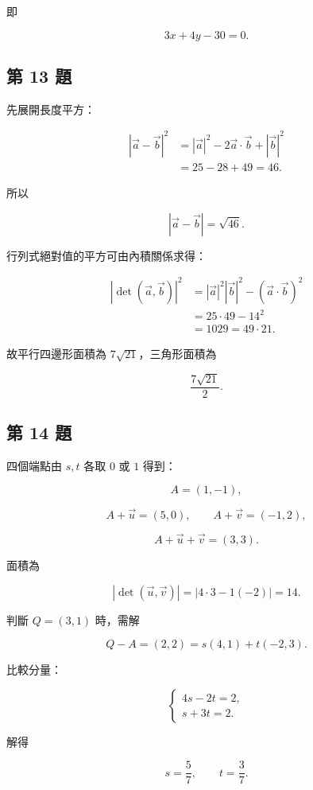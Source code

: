 \documentclass[11pt,a4paper]{article}
\begin{document}
即

\[
\boxed{3x+4y-30=0}.
\]

\subsection{第 13 題}\label{ux7b2c-13-ux984c}

先展開長度平方：

\[
\begin{aligned}
|\vec a-\vec b|^2
&=|\vec a|^2-2\vec a\cdot\vec b+|\vec b|^2\\
&=25-28+49=46.
\end{aligned}
\]

所以

\[
\boxed{|\vec a-\vec b|=\sqrt{46}}.
\]

行列式絕對值的平方可由內積關係求得：

\[
\begin{aligned}
|\det(\vec a,\vec b)|^2
&=|\vec a|^2|\vec b|^2-(\vec a\cdot\vec b)^2\\
&=25\cdot49-14^2\\
&=1029=49\cdot21.
\end{aligned}
\]

故平行四邊形面積為 \(\boxed{7\sqrt{21}}\)，三角形面積為

\[
\boxed{\frac{7\sqrt{21}}2}.
\]

\subsection{第 14 題}\label{ux7b2c-14-ux984c}

四個端點由 \(s,t\) 各取 \(0\) 或 \(1\) 得到：

\[
A=(1,-1),
\]

\[
A+\vec u=(5,0),
\qquad
A+\vec v=(-1,2),
\]

\[
A+\vec u+\vec v=(3,3).
\]

面積為

\[
|\det(\vec u,\vec v)|
=|4\cdot3-1(-2)|
=\boxed{14}.
\]

判斷 \(Q=(3,1)\) 時，需解

\[
Q-A=(2,2)=s(4,1)+t(-2,3).
\]

比較分量：

\[
\begin{cases}
4s-2t=2,\\
s+3t=2.
\end{cases}
\]

解得

\[
\boxed{s=\frac57,
\qquad
t=\frac37}.
\]
\end{document}
